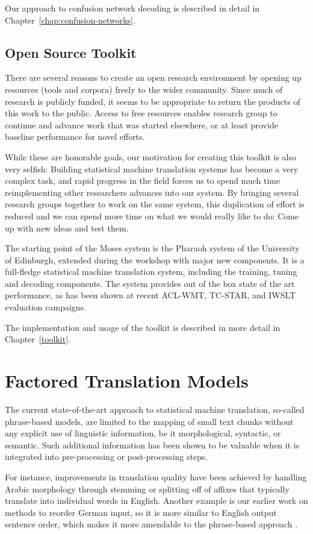 \documentclass[11pt]{report}
\theoremstyle{plain}
\begin{document}
Our approach to confusion network decoding is described in detail in Chapter~\ref{chap:confusion-networks}.

\section{Open Source Toolkit}
There are several reasons to create an open research environment by opening up resources (tools and corpora) freely to the wider community. Since much of research is publicly funded, it seems to be appropriate to return the products of this work to the public. Access to free resources enables research group to continue and advance work that was started elsewhere, or at least provide baseline performance for novel efforts.

While these are honorable goals, our motivation for creating this toolkit is also very selfish: Building statistical machine translation systems has become a very complex task, and rapid progress in the field forces us to spend much time reimplementing other researchers advances into our system. By bringing several research groups together to work on the same system, this duplication of effort is reduced and we can spend more time on what we would really like to do: Come up with new ideas and test them.

The starting point of the Moses system is the Pharaoh system of the University of Edinburgh, extended during the workshop with major new components. It is a full-fledge statistical machine translation system, including the training, tuning and decoding components. The system provides out of the box state of the art performance, as has been shown at recent ACL-WMT, TC-STAR, and IWSLT evaluation campaigns.

The implementation and usage of the toolkit is described in more detail in Chapter~\ref{toolkit}.

\chapter{Factored Translation Models}\label{chap:factored-models}
The current state-of-the-art approach to statistical machine translation, so-called phrase-based models, are limited to the mapping of small text chunks without any explicit use of linguistic information, be it morphological, syntactic, or semantic. Such additional information has been shown to be valuable when it is integrated into pre-processing or post-processing steps. 

For instance, improvements in translation quality have been achieved by handling Arabic morphology through stemming or splitting off of affixes that typically translate into individual words in English. Another example is our earlier work on methods to reorder German input, so it is more similar to English output sentence order, which makes it more amendable to the phrase-based approach \cite{Collins2005}.
\end{document}

